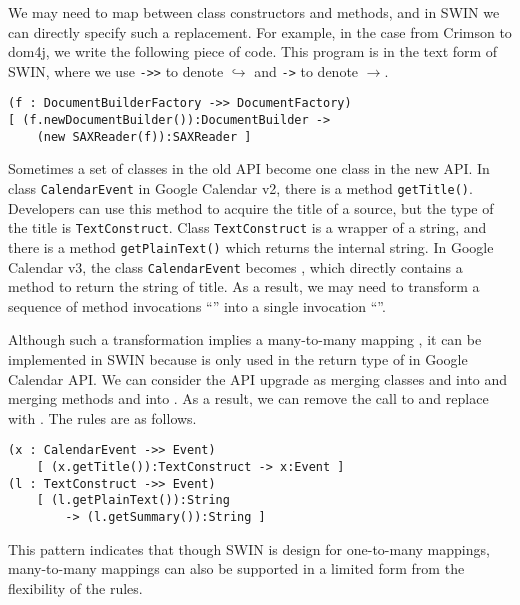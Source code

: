  We may need to
map between class constructors and methods, and in SWIN we can
directly specify such a replacement. For example, in the case from
Crimson to dom4j, we write the following piece of code. This program
is in the text form of SWIN, where we use \texttt{->>} to denote $\hookrightarrow$
and \texttt{->} to denote $\rightarrow$.
\begin{lstlisting}
(f : DocumentBuilderFactory ->> DocumentFactory)
[ (f.newDocumentBuilder()):DocumentBuilder ->
    (new SAXReader(f)):SAXReader ]
\end{lstlisting}

 Sometimes a set of classes in the old API
become one class in the new API. In class \texttt{CalendarEvent} in
Google Calendar v2, there is a method \texttt{getTitle()}. Developers
can use this method to acquire the title of a source, but the type of
the title is \texttt{TextConstruct}.  Class \texttt{TextConstruct} is
a wrapper of a string, and there is a method \texttt{getPlainText()}
which returns the internal string. In Google Calendar v3, the class
\texttt{CalendarEvent} becomes , which directly contains a
method  to return the string of title. As a result,
we may need to transform a sequence of method invocations
``'' into a single invocation ``''.

Although such a transformation implies a many-to-many mapping%
, it can be implemented in SWIN because
 is only used in the return type of
 in Google Calendar API. We can consider the API
upgrade as merging classes  and  into
 and merging methods  and
 into . As a result, we can
remove the call to  and replace
 with . The rules are as
follows.

\begin{lstlisting}
(x : CalendarEvent ->> Event) 
    [ (x.getTitle()):TextConstruct -> x:Event ]
(l : TextConstruct ->> Event) 
    [ (l.getPlainText()):String 
        -> (l.getSummary()):String ]
\end{lstlisting}

This pattern indicates that though SWIN is design for one-to-many
mappings, many-to-many mappings can also be supported in a limited
form from the flexibility of the rules.

